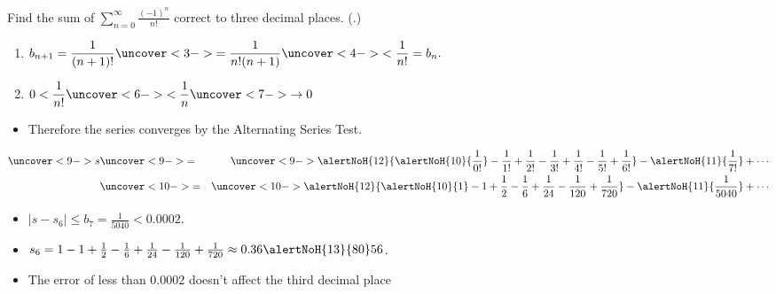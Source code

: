 \begin{frame}
\begin{example} %
Find the sum of $\sum_{n=0}^\infty \frac{(-1)^n}{n!}$ correct to three decimal places.  (.)
\begin{enumerate}
\item<2->  $\displaystyle b_{n+1} = \frac{1}{(n+1)!} \uncover<3->{ = \frac{1}{n!(n+1)} } \uncover<4->{ < \frac{1}{n!} = b_n.}$
\item<5->  $\displaystyle 0 < \frac{1}{n!} \uncover<6->{ < \frac{1}{n} }\uncover<7->{ \to 0 }$ 
\end{enumerate}
\begin{itemize}
\item<8->  Therefore the series converges by the Alternating Series Test.
\end{itemize}
\abovedisplayskip=0pt
\belowdisplayskip=0pt
\begin{eqnarray*}
\uncover<9->{s} & \uncover<9->{=} & \uncover<9->{\alertNoH{ 12}{\alertNoH{ 10}{\frac{1}{0!}} - \frac{1}{1!} + \frac{1}{2!} - \frac{1}{3!} + \frac{1}{4!} - \frac{1}{5!} + \frac{1}{6!}} - \alertNoH{ 11}{\frac{1}{7!}} + \cdots}\\
 & \uncover<10->{=} & \uncover<10->{\alertNoH{ 12}{\alertNoH{ 10}{1} - 1 + \frac{1}{2} - \frac{1}{6} + \frac{1}{24} - \frac{1}{120} + \frac{1}{720}} - \alertNoH{ 11}{\frac{1}{5040}} + \cdots}
\end{eqnarray*}
\begin{itemize}
\item<11-| alert@11,13>  $|s - s_6| \leq b_7 = \frac{1}{5040} < 0.0002$.
\item<12-| alert@12>  $s_6 = 1 - 1 + \frac{1}{2} - \frac{1}{6} + \frac{1}{24} - \frac{1}{120} + \frac{1}{720} \approx 0.36\alertNoH{ 13}{80}56$.
\item<13->  The error of less than $0.0002$ doesn't affect the third decimal place
\end{itemize}
\end{example}
\end{frame}
